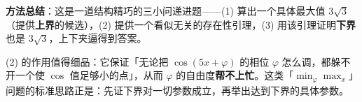\begin{answer}

\begin{gktip}
\textbf{方法总结}：这是一道结构精巧的三小问递进题——(1) 算出一个具体最大值 $3\sqrt3$（提供\textbf{上界}的候选），(2) 提供一个看似无关的存在性引理，(3) 用该引理证明\textbf{下界}也是 $3\sqrt3$，上下夹逼得到答案。

(2) 的作用值得细品：它保证「无论把 $\cos(5x+\varphi)$ 的相位 $\varphi$ 怎么调，都躲不开一个使 $\cos$ 值足够小的点」，从而 $\varphi$ 的自由度\textbf{帮不上忙}。这类「$\min_\varphi\max_x$」问题的标准思路正是：先证下界对一切参数成立，再举出达到下界的具体参数。
\end{gktip}




\end{answer}